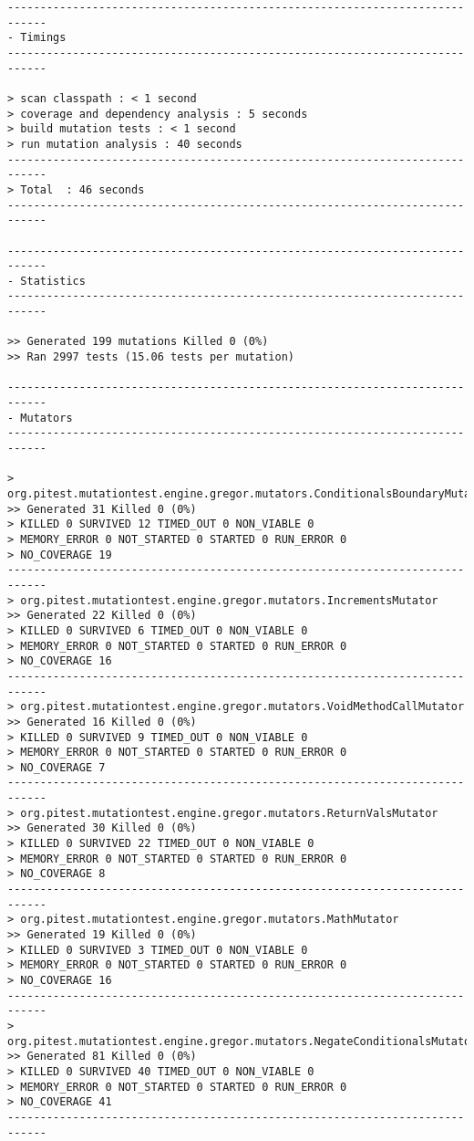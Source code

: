 \begin{lstlisting}
----------------------------------------------------------------------------
- Timings
----------------------------------------------------------------------------

> scan classpath : < 1 second
> coverage and dependency analysis : 5 seconds
> build mutation tests : < 1 second
> run mutation analysis : 40 seconds
----------------------------------------------------------------------------
> Total  : 46 seconds
----------------------------------------------------------------------------

----------------------------------------------------------------------------
- Statistics
----------------------------------------------------------------------------

>> Generated 199 mutations Killed 0 (0%)
>> Ran 2997 tests (15.06 tests per mutation)

----------------------------------------------------------------------------
- Mutators
----------------------------------------------------------------------------

> org.pitest.mutationtest.engine.gregor.mutators.ConditionalsBoundaryMutator
>> Generated 31 Killed 0 (0%)
> KILLED 0 SURVIVED 12 TIMED_OUT 0 NON_VIABLE 0 
> MEMORY_ERROR 0 NOT_STARTED 0 STARTED 0 RUN_ERROR 0 
> NO_COVERAGE 19 
----------------------------------------------------------------------------
> org.pitest.mutationtest.engine.gregor.mutators.IncrementsMutator
>> Generated 22 Killed 0 (0%)
> KILLED 0 SURVIVED 6 TIMED_OUT 0 NON_VIABLE 0 
> MEMORY_ERROR 0 NOT_STARTED 0 STARTED 0 RUN_ERROR 0 
> NO_COVERAGE 16 
----------------------------------------------------------------------------
> org.pitest.mutationtest.engine.gregor.mutators.VoidMethodCallMutator
>> Generated 16 Killed 0 (0%)
> KILLED 0 SURVIVED 9 TIMED_OUT 0 NON_VIABLE 0 
> MEMORY_ERROR 0 NOT_STARTED 0 STARTED 0 RUN_ERROR 0 
> NO_COVERAGE 7 
----------------------------------------------------------------------------
> org.pitest.mutationtest.engine.gregor.mutators.ReturnValsMutator
>> Generated 30 Killed 0 (0%)
> KILLED 0 SURVIVED 22 TIMED_OUT 0 NON_VIABLE 0 
> MEMORY_ERROR 0 NOT_STARTED 0 STARTED 0 RUN_ERROR 0 
> NO_COVERAGE 8 
----------------------------------------------------------------------------
> org.pitest.mutationtest.engine.gregor.mutators.MathMutator
>> Generated 19 Killed 0 (0%)
> KILLED 0 SURVIVED 3 TIMED_OUT 0 NON_VIABLE 0 
> MEMORY_ERROR 0 NOT_STARTED 0 STARTED 0 RUN_ERROR 0 
> NO_COVERAGE 16 
----------------------------------------------------------------------------
> org.pitest.mutationtest.engine.gregor.mutators.NegateConditionalsMutator
>> Generated 81 Killed 0 (0%)
> KILLED 0 SURVIVED 40 TIMED_OUT 0 NON_VIABLE 0 
> MEMORY_ERROR 0 NOT_STARTED 0 STARTED 0 RUN_ERROR 0 
> NO_COVERAGE 41 
----------------------------------------------------------------------------
\end{lstlisting}
